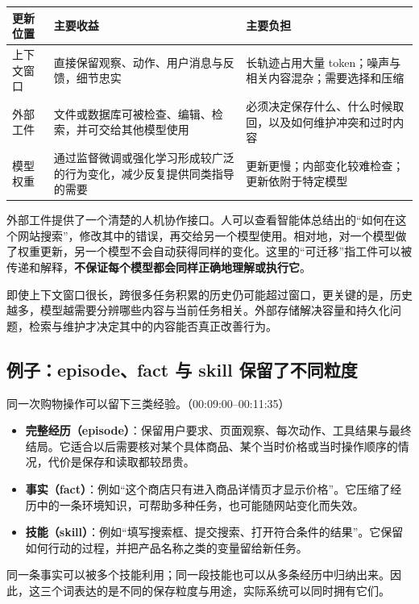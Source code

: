 \documentclass[11pt,a4paper]{article}
\begin{document}
\begin{center}
\small
\begin{tabularx}{\textwidth}{p{2.4cm}XX}
\toprule
更新位置 & 主要收益 & 主要负担 \\
\midrule
上下文窗口 & 直接保留观察、动作、用户消息与反馈，细节忠实 & 长轨迹占用大量 token；噪声与相关内容混杂；需要选择和压缩 \\
外部工件 & 文件或数据库可被检查、编辑、检索，并可交给其他模型使用 & 必须决定保存什么、什么时候取回，以及如何维护冲突和过时内容 \\
模型权重 & 通过监督微调或强化学习形成较广泛的行为变化，减少反复提供同类指导的需要 & 更新更慢；内部变化较难检查；更新依附于特定模型 \\
\bottomrule
\end{tabularx}
\end{center}

外部工件提供了一个清楚的人机协作接口。人可以查看智能体总结出的“如何在这个网站搜索”，修改其中的错误，再交给另一个模型使用。相对地，对一个模型做了权重更新，另一个模型不会自动获得同样的变化。这里的“可迁移”指工件可以被传递和解释，\textbf{不保证每个模型都会同样正确地理解或执行它}。

即使上下文窗口很长，跨很多任务积累的历史仍可能超过窗口，更关键的是，历史越多，模型越需要分辨哪些内容与当前任务相关。外部存储解决容量和持久化问题，检索与维护才决定其中的内容能否真正改善行为。

\subsection{例子：episode、fact 与 skill 保留了不同粒度}

同一次购物操作可以留下三类经验。（00:09:00--00:11:35）

\begin{itemize}
\item \textbf{完整经历（episode）}：保留用户要求、页面观察、每次动作、工具结果与最终结局。它适合以后需要核对某个具体商品、某个当时价格或当时操作顺序的情况，代价是保存和读取都较昂贵。
\item \textbf{事实（fact）}：例如“这个商店只有进入商品详情页才显示价格”。它压缩了经历中的一条环境知识，可帮助多种任务，也可能随网站变化而失效。
\item \textbf{技能（skill）}：例如“填写搜索框、提交搜索、打开符合条件的结果”。它保留如何行动的过程，并把产品名称之类的变量留给新任务。
\end{itemize}

同一条事实可以被多个技能利用；同一段技能也可以从多条经历中归纳出来。因此，这三个词表达的是不同的保存粒度与用途，实际系统可以同时拥有它们。
\end{document}
